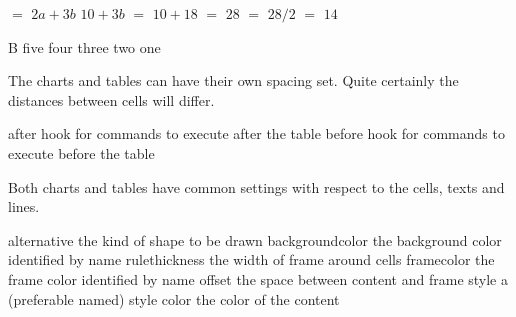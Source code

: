 \startbuffer
\startSTEPchart
{}
   
   
 
  
\stopSTEPchart
\stopbuffer

\typebuffer \getbuffer

\startbuffer
\startSTEPtable
{}
\stopSTEPtable
\stopbuffer

\typebuffer \getbuffer

\startbuffer
\startSTEPaligntable
{} {$=$} {$2a+3b$}
 {$10+3b$}
 {$=$} {$10+18$}
 {$=$} {$28$}
 {$=$} {$28/2$}
 {$=$} {$14$}
\stopSTEPaligntable
\stopbuffer

\typebuffer \getbuffer

\startbuffer
\startSTEPchart
         {B}
       {five}  
       {four}  
     {three} 
      {two}   
      {one}
\stopSTEPchart
\stopbuffer

\typebuffer \getbuffer

\stopsection

\startsection[title=Configuring]

The charts and tables can have their own spacing set. Quite certainly the
distances between cells will differ.

\starttabulate[|Tl|l|]
\HL
\NC {} \NC \NC \NR
\HL
\NC after     \NC hook for commands to execute after the table \NC \NR
\NC before    \NC hook for commands to execute before the table \NC \NR
\HL
\stoptabulate

Both charts and tables have common settings with respect to the cells, texts and
lines.

\starttabulate[|Tl|l|]
\HL
\NC {} \NC \NC \NR
\HL
\NC alternative   \NC the kind of shape to be drawn \NC \NR
\NC backgroundcolor \NC the background color identified by name \NC \NR
\NC rulethickness   \NC the width of frame around cells \NC \NR
\NC framecolor      \NC the frame color identified by name \NC \NR
\NC offset          \NC the space between content and frame \NC \NR
\NC style           \NC a (preferable named) style \NC \NR
\NC color           \NC the color of the content \NC \NR
\HL
\stoptabulate

